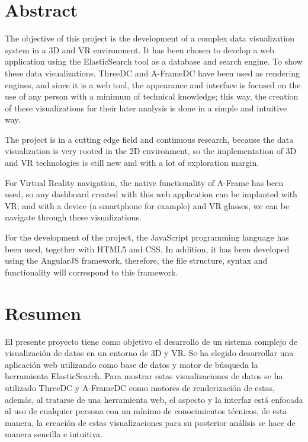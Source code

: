 \documentclass[a4paper, 12pt]{book}
\begin{document}

\chapter*{Abstract}
The objective of this project is the development of a complex data visualization system in a 3D and VR environment. It has been chosen to develop a web application using the ElasticSearch tool as a database and search engine. To show these data visualizations, ThreeDC and A-FrameDC have been used as rendering engines, and since it is a web tool, the appearance and interface is focused on the use of any person with a minimum of technical knowledge; this way, the creation of these visualizations for their later analysis is done in a simple and intuitive way.

The project is in a cutting edge field and continuous research, because the data visualization is very rooted in the 2D environment, so the implementation of 3D and VR technologies is still new and with a lot of exploration margin.

For Virtual Reality navigation, the native functionality of A-Frame has been used, so any dashboard created with this web application can be implanted with VR; and with a device (a smartphone for example) and VR glasses, we can be navigate through these visualizations.

For the development of the project, the JavaScript programming language has been used, together with HTML5 and CSS. In addition, it has been developed using the AngularJS framework, therefore, the file structure, syntax and functionality will correspond to this framework.


\chapter*{Resumen}

El presente proyecto tiene como objetivo el desarrollo de un sistema complejo de visualización de datos en un entorno de 3D y VR. Se ha elegido desarrollar una aplicación web utilizando como base de datos y motor de búsqueda la herramienta ElasticSearch. Para mostrar estas visualizaciones de datos se ha utilizado ThreeDC y A-FrameDC como motores de renderización de estas, además, al tratarse de una herramienta web, el aspecto y la interfaz está enfocada al uso de cualquier persona con un mínimo de conocimientos técnicos, de esta manera, la creación de estas visualizaciones para su posterior análisis se hace de manera sencilla e intuitiva.
\end{document}
